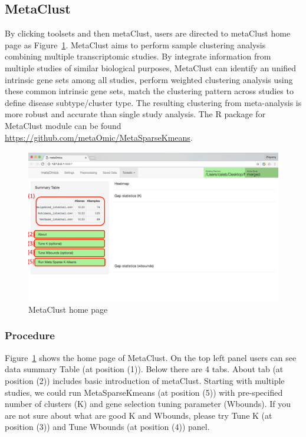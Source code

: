 \subsection{MetaClust}
By clicking toolsets and then metaClust,
users are directed to metaClust home page as Figure~\ref{fig:metaClustHome}.
MetaClust \citep{huo2016meta} aims to perform sample clustering analysis combining multiple transcriptomic studies.
By integrate information from multiple studies of similar biological purposes,
MetaClust can identify an unified intrinsic gene sets among all studies, perform weighted clustering analysis using these common intrinsic gene sets,
match the clustering pattern across studies to define disease subtype/cluster type.
The resulting clustering from meta-analysis is more robust and accurate than single study analysis.
The R package for MetaClust module can be found \url{https://github.com/metaOmic/MetaSparseKmeans}.


\begin{figure}[H]
\begin{center}
\includegraphics[scale=0.4]{./figure/metaClust/metaClustHome}
\caption{MetaClust home page}
\label{fig:metaClustHome}
\end{center}
\end{figure}

\subsubsection{Procedure}

Figure~\ref{fig:metaClustHome} shows the home page of MetaClust.
On the top left panel users can see data summary Table (at position {\color{red} (1)}).
Below there are 4 tabs. 
About tab (at position {\color{red} (2)}) includes basic introduction of metaClust.
Starting with multiple studies, 
we could run MetaSparseKmeans (at position {\color{red} (5)}) with pre-specified number of clusters (K) and gene selection tuning parameter (Wbounds).
If you are not sure about what are good K and Wbounds, please try Tune K (at position {\color{red} (3)}) and Tune Wbounds (at position {\color{red} (4)}) panel.

